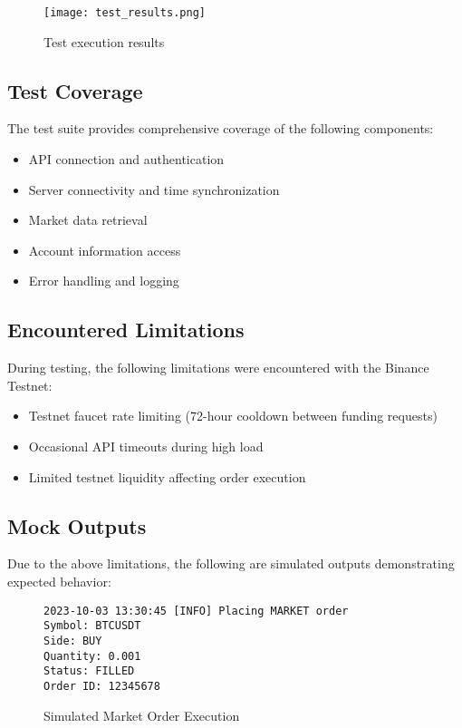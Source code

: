 \documentclass[12pt,a4paper]{article}
\begin{document}
\begin{figure}[H]
    \centering
    \texttt{[image: test\_results.png]}
    \caption{Test execution results}
    \label{fig:test_results}
\end{figure}

\subsection{Test Coverage}
The test suite provides comprehensive coverage of the following components:
\begin{itemize}
    \item API connection and authentication
    \item Server connectivity and time synchronization
    \item Market data retrieval
    \item Account information access
    \item Error handling and logging
\end{itemize}

\subsection{Encountered Limitations}
During testing, the following limitations were encountered with the Binance Testnet:
\begin{itemize}
    \item Testnet faucet rate limiting (72-hour cooldown between funding requests)
    \item Occasional API timeouts during high load
    \item Limited testnet liquidity affecting order execution
\end{itemize}

\subsection{Mock Outputs}
Due to the above limitations, the following are simulated outputs demonstrating expected behavior:

\begin{figure}[H]
    \centering
    \begin{verbatim}
2023-10-03 13:30:45 [INFO] Placing MARKET order
Symbol: BTCUSDT
Side: BUY
Quantity: 0.001
Status: FILLED
Order ID: 12345678
    \end{verbatim}
    \caption{Simulated Market Order Execution}
\end{figure}
\end{document}
